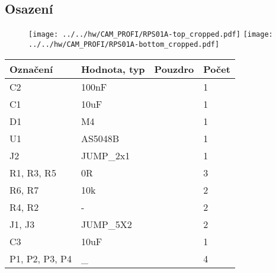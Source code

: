\subsection{Osazení}


\begin{figure}[ht!]
	\centering
	\texttt{[image: ../../hw/CAM\_PROFI/RPS01A-top\_cropped.pdf]}
	\qquad
	\texttt{[image: ../../hw/CAM\_PROFI/RPS01A-bottom\_cropped.pdf]}
\end{figure}

\begin{center}
  \begin{tabular}{ | l | l | l | l |}
    \hline
    Označení & Hodnota, typ & Pouzdro & Počet \\ \hline
    \hline
			C2 & 100nF &  & 1\\ \hline
			C1 & 10uF &  & 1\\ \hline
			D1 & M4 &  & 1\\ \hline
			U1 & AS5048B &  & 1\\ \hline
			J2 & JUMP\_2x1 &  & 1\\ \hline
			R1, R3, R5 & 0R &  & 3\\ \hline
			R6, R7 & 10k &  & 2\\ \hline
			R4, R2 & - &  & 2\\ \hline
			J1, J3 & JUMP\_5X2 &  & 2\\ \hline
			C3 & 10uF &  & 1\\ \hline
			P1, P2, P3, P4 & \_ &  & 4\\ \hline
	
  \end{tabular}
\end{center}